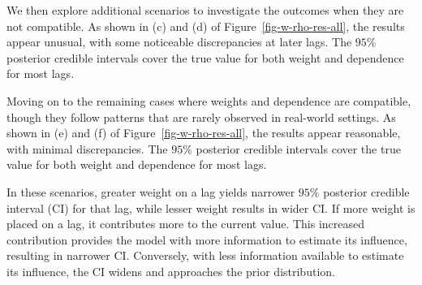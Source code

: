 \documentclass[
  letterpaper,
  double,
  12pt,
  1.0in]{beavtex}
\begin{document}
We then explore additional scenarios to investigate the outcomes when
they are not compatible. As shown in (c) and (d) of
Figure~\ref{fig-w-rho-res-all}, the results appear unusual, with some
noticeable discrepancies at later lags. The \(95\%\) posterior credible
intervals cover the true value for both weight and dependence for most
lags.

Moving on to the remaining cases where weights and dependence are
compatible, though they follow patterns that are rarely observed in
real-world settings. As shown in (e) and (f) of
Figure~\ref{fig-w-rho-res-all}, the results appear reasonable, with
minimal discrepancies. The \(95\%\) posterior credible intervals cover
the true value for both weight and dependence for most lags.

In these scenarios, greater weight on a lag yields narrower \(95\%\)
posterior credible interval (CI) for that lag, while lesser weight
results in wider CI. If more weight is placed on a lag, it contributes
more to the current value. This increased contribution provides the
model with more information to estimate its influence, resulting in
narrower CI. Conversely, with less information available to estimate its
influence, the CI widens and approaches the prior distribution.
\end{document}
